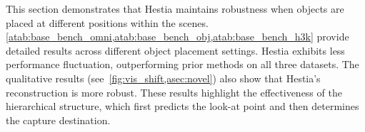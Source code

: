 This section demonstrates that Hestia maintains robustness when objects are placed at different positions within the scenes. 
\cref{atab:base_bench_omni,atab:base_bench_obj,atab:base_bench_h3k} provide detailed results across different object placement settings.
Hestia exhibits less performance fluctuation, outperforming prior methods on all three datasets.
The qualitative results (see~\cref{fig:vis_shift,asec:novel}) also show that Hestia's reconstruction is more robust.
These results highlight the effectiveness of the hierarchical structure, which first predicts the look-at point and then determines the capture destination.


